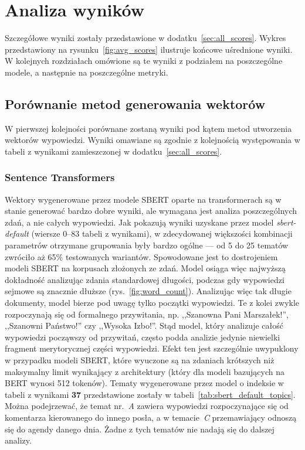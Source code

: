 
\chapter{Analiza wyników}\label{sec:scores_analysis}
	Szczegółowe wyniki zostały przedstawione w dodatku~\ref{sec:all_scores}.
	Wykres przedstawiony na rysunku~\ref{fig:avg_scores} ilustruje końcowe uśrednione wyniki.
	W kolejnych rozdziałach omówione są te wyniki z podziałem na poszczególne modele,
		a następnie na poszczególne metryki.

\section{Porównanie metod generowania wektorów}
	W pierwszej kolejności porównane zostaną wyniki pod kątem metod utworzenia wektorów wypowiedzi.
	Wyniki omawiane są zgodnie z kolejnością występowania w tabeli z wynikami zamieszczonej w dodatku~\ref{sec:all_scores}.

	\subsection{Sentence Transformers}\label{sec:sbert_summary}
		Wektory wygenerowane przez modele SBERT oparte na transformerach są w stanie generować bardzo dobre wyniki,
			ale wymagana jest analiza poszczególnych zdań, a nie całych wypowiedzi.
		Jak pokazują wyniki uzyskane przez model \emph{sbert-default} (wiersze 0--83 tabeli z wynikami),
			w zdecydowanej większości kombinacji parametrów otrzymane grupowania były bardzo ogólne --- od 5 do 25 tematów zwróciło aż 65\% testowanych wariantów.
		Spowodowane jest to dostrojeniem modeli SBERT na korpusach złożonych ze zdań.
		Model osiąga więc najwyższą dokładność analizując zdania standardowej długości, podczas gdy wypowiedzi sejmowe są znacznie dłuższe (rys.~\ref{fig:word_count}).
		Analizując więc tak długie dokumenty, model bierze pod uwagę tylko początki wypowiedzi.
		Te z kolei zwykle rozpoczynają się od formalnego przywitania, np. ,,Szanowna Pani Marszałek!'', ,,Szanowni Państwo!'' czy ,,Wysoka Izbo!''.
		Stąd model, który analizuje całość wypowiedzi począwszy od przywitań, często podda analizie jedynie niewielki fragment merytorycznej części wypowiedzi.
		Efekt ten jest szczególnie uwypuklony w przypadku modeli SBERT, które wyuczone są na zdaniach krótszych niż maksymalny limit wynikający z architektury
			(który dla modeli bazujących na BERT wynosi 512 tokenów).
		Tematy wygenerowane przez model o indeksie w tabeli z wynikami \textbf{37} przedstawione zostały w tabeli~\ref{tab:sbert_default_topics}.
		Można podejrzewać, że temat nr.~\emph{A} zawiera wypowiedzi rozpoczynające się od komentarza kierowanego do innego posła, a w temacie~\emph{C} przemawiający odnoszą się do agendy danego dnia.
		Żadne z tych tematów nie nadają się do dalszej analizy.

